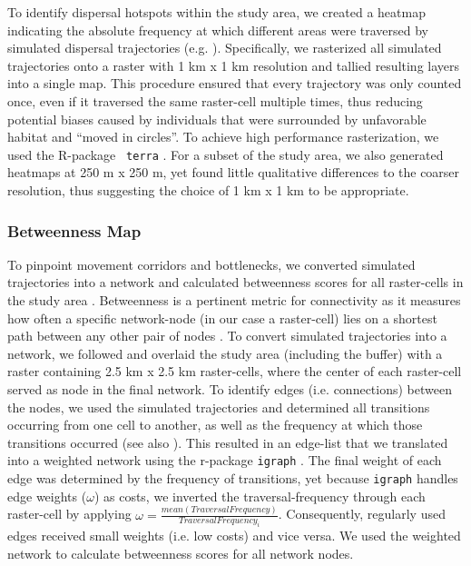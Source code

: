 \documentclass[../FinalThesis.tex]{subfiles}
\begin{document}
To identify dispersal hotspots within the study area, we created a heatmap
indicating the absolute frequency at which different areas were traversed by
simulated dispersal trajectories (e.g. \citealp{Hauenstein.2019, Zeller.2020}).
Specifically, we rasterized all simulated trajectories onto a raster with 1 km x
1 km resolution and tallied resulting layers into a single map. This procedure
ensured that every trajectory was only counted once, even if it traversed the
same raster-cell multiple times, thus reducing potential biases caused by
individuals that were surrounded by unfavorable habitat and ``moved in
circles''. To achieve high performance rasterization, we used the R-package {\tt
terra} \citep{Hijmans.2024}. For a subset of the study area, we also generated
heatmaps at 250 m x 250 m, yet found little qualitative differences to the
coarser resolution, thus suggesting the choice of 1 km x 1 km to be appropriate.

\subsubsection{Betweenness Map}

To pinpoint movement corridors and bottlenecks, we converted simulated
trajectories into a network and calculated betweenness scores for all
raster-cells in the study area \citep{Bastille-Rousseau.2018}. Betweenness is a
pertinent metric for connectivity as it measures how often a specific
network-node (in our case a raster-cell) lies on a shortest path between any
other pair of nodes \citep{Bastille-Rousseau.2018}. To convert simulated
trajectories into a network, we followed \citet{Bastille-Rousseau.2018} and
overlaid the study area (including the buffer) with a raster containing 2.5 km x
2.5 km raster-cells, where the center of each raster-cell served as node in the
final network. To identify edges (i.e. connections) between the nodes, we used
the simulated trajectories and determined all transitions occurring from one
cell to another, as well as the frequency at which those transitions occurred
(see also ). This resulted in an edge-list that we
translated into a weighted network using the r-package \texttt{igraph}
\citep{Csardi.2006}. The final weight of each edge was determined by the
frequency of transitions, yet because \texttt{igraph} handles edge weights
(\(\omega\)) as costs, we inverted the traversal-frequency through each
raster-cell by applying \(\omega = \frac{mean(Traversal Frequency)}{Traversal
Frequency_i}\). Consequently, regularly used edges received small weights (i.e.
low costs) and vice versa. We used the weighted network to calculate betweenness
scores for all network nodes.
\end{document}
